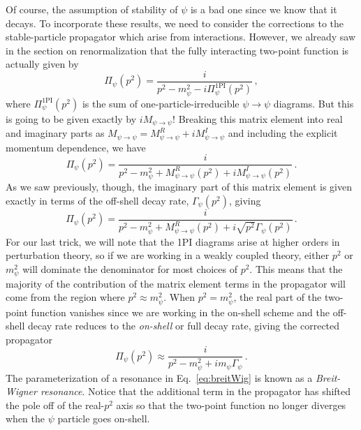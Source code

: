 \documentclass{article}
\numberwithin{equation}{subsection}
\begin{document}
Of course, the assumption of stability of $\psi$ is a bad one since we know that it decays. To incorporate these results, we need
to consider the corrections to the stable-particle propagator which arise from interactions. However, we already saw in the section
on renormalization that the fully interacting two-point function is actually given by
\begin{equation}
 \Pi_\psi(p^2) = \frac{i}{p^2 - m_\psi^2 - i\Pi_\psi^{1\text{PI}}(p^2)}\,,
\end{equation}
where $\Pi_\psi^{1\text{PI}}(p^2)$ is the sum of one-particle-irreducible $\psi\to\psi$ diagrams. But this is going to be given
exactly by $iM_{\psi\to\psi}$! Breaking this matrix element into real and imaginary parts as 
$M_{\psi\to\psi} = M_{\psi\to\psi}^R + i M_{\psi\to\psi}^I$ and including the explicit momentum dependence, we have
\begin{equation}
 \Pi_\psi(p^2) = \frac{i}{p^2 - m_\psi^2 + M_{\psi\to\psi}^R(p^2) + i M_{\psi\to\psi}^I(p^2)}\,.
\end{equation}
As we saw previously, though, the imaginary part of this matrix element is given exactly in terms of
the off-shell decay rate, $\Gamma_\psi(p^2)$, giving
\begin{equation}
 \Pi_\psi(p^2) = \frac{i}{p^2 - m_\psi^2 + M_{\psi\to\psi}^R(p^2) + i \sqrt{p^2}\Gamma_\psi(p^2)}\,.
\end{equation}
For our last trick, we will note that the 1PI diagrams arise at higher orders in perturbation theory, so
if we are working in a weakly coupled theory, either $p^2$ or $m_\psi^2$ will dominate the denominator
for most choices of $p^2$. This means that the majority of the contribution of the matrix element terms
in the propagator will come from the region where $p^2 \approx m_\psi^2$. When $p^2=m_\psi^2$, the real
part of the two-point function vanishes since we are working in the on-shell scheme and the off-shell
decay rate reduces to the \textit{on-shell} or full decay rate, giving the corrected propagator
\begin{equation}\label{eq:breitWig}
 \Pi_\psi(p^2) \approx \frac{i}{p^2 - m_\psi^2 + i m_\psi\Gamma_\psi}\,.
\end{equation}
The parameterization of a resonance in Eq.~\eqref{eq:breitWig} is known as a \textit{Breit-Wigner resonance}.
Notice that the additional term in the propagator has shifted the pole off of the real-$p^2$ axis 
so that the two-point function no longer diverges when the $\psi$ particle goes on-shell.
\end{document}

